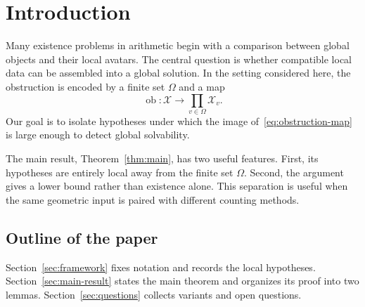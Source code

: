 \section{Introduction}\label{sec:introduction}

Many existence problems in arithmetic begin with a comparison between global
objects and their local avatars. The central question is whether compatible
local data can be assembled into a global solution. In the setting considered
here, the obstruction is encoded by a finite set $\Omega$ and a map
\begin{equation}\label{eq:obstruction-map}
  \operatorname{ob}\colon \mathcal{X}\longrightarrow \prod_{v\in\Omega}
  \mathcal{X}_v.
\end{equation}
Our goal is to isolate hypotheses under which the image of~\eqref{eq:obstruction-map}
is large enough to detect global solvability.

The main result, Theorem~\ref{thm:main}, has two useful features. First, its
hypotheses are entirely local away from the finite set $\Omega$. Second, the
argument gives a lower bound rather than existence alone. This separation is
useful when the same geometric input is paired with different counting
methods.

\subsection{Outline of the paper}

Section~\ref{sec:framework} fixes notation and records the local hypotheses.
Section~\ref{sec:main-result} states the main theorem and organizes its proof
into two lemmas. Section~\ref{sec:questions} collects variants and open
questions.
